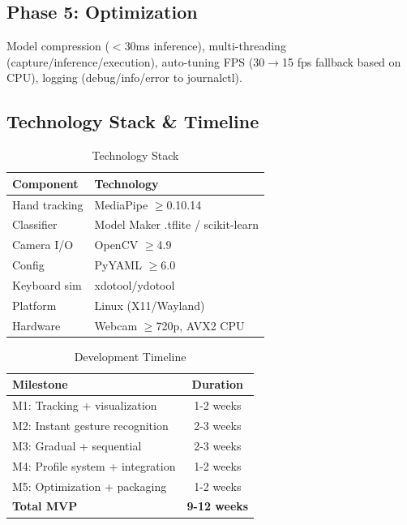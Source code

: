 \documentclass[11pt]{article}
\begin{document}
\subsection{Phase 5: Optimization}

Model compression ($<$30ms inference), multi-threading (capture/inference/execution), auto-tuning FPS (30$\rightarrow$15 fps fallback based on CPU), logging (debug/info/error to journalctl).

\subsection{Technology Stack \& Timeline}

\begin{table}[h]
\centering
\small
\begin{tabular}{@{}ll@{}}
\toprule
\textbf{Component} & \textbf{Technology} \\
\midrule
Hand tracking & MediaPipe $\geq$0.10.14 \\
Classifier & Model Maker .tflite / scikit-learn \\
Camera I/O & OpenCV $\geq$4.9 \\
Config & PyYAML $\geq$6.0 \\
Keyboard sim & xdotool/ydotool \\
Platform & Linux (X11/Wayland) \\
Hardware & Webcam $\geq$720p, AVX2 CPU \\
\bottomrule
\end{tabular}
\caption{Technology Stack}
\end{table}

\begin{table}[h]
\centering
\small
\begin{tabular}{@{}lc@{}}
\toprule
\textbf{Milestone} & \textbf{Duration} \\
\midrule
M1: Tracking + visualization & 1-2 weeks \\
M2: Instant gesture recognition & 2-3 weeks \\
M3: Gradual + sequential & 2-3 weeks \\
M4: Profile system + integration & 1-2 weeks \\
M5: Optimization + packaging & 1-2 weeks \\
\midrule
\textbf{Total MVP} & \textbf{9-12 weeks} \\
\bottomrule
\end{tabular}
\caption{Development Timeline}
\end{table}
\end{document}
